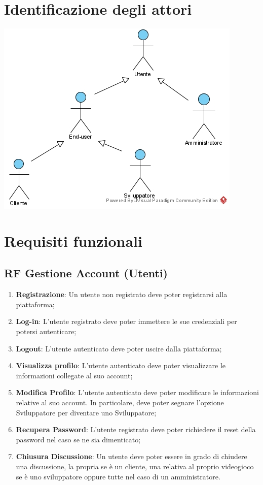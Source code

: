 \section{Identificazione degli attori}
\begin{center}
\includegraphics{Figure/actorsDiagram.jpg}
\end{center}

\section{Requisiti funzionali}
\subsection{RF Gestione Account (Utenti)}
\begin{enumerate}
	\item \textbf{Registrazione}: Un utente non registrato deve poter registrarsi alla piattaforma;
	\item \textbf{Log-in}: L’utente registrato deve poter immettere le sue credenziali per potersi autenticare;
	\item \textbf{Logout}: L’utente autenticato deve poter uscire dalla piattaforma;
	\item \textbf{Visualizza profilo}: L’utente autenticato deve poter visualizzare le informazioni collegate al suo account;
	\item \textbf{Modifica Profilo}: L’utente autenticato deve poter modificare le informazioni relative al suo account. In particolare, deve poter segnare l’opzione Sviluppatore per diventare uno Sviluppatore;
	\item \textbf{Recupera Password}: L’utente registrato deve poter richiedere il reset della password nel caso se ne sia dimenticato;
	\item \textbf{Chiusura Discussione}: Un utente deve poter essere in grado di chiudere una discussione, la propria se è un cliente, una relativa al proprio videogioco se è uno sviluppatore oppure tutte nel caso di un amministratore.
\end{enumerate}

